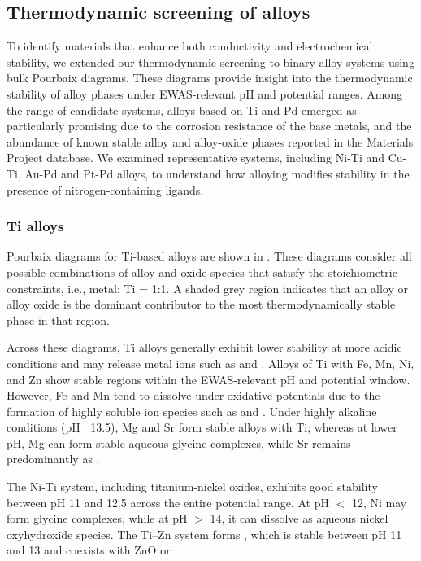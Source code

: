 \documentclass[journal=jacsat,manuscript=article]{achemso}
\begin{document}
\subsection{Thermodynamic screening of alloys} \label{sec:alloy_screening}

To identify materials that enhance both conductivity and electrochemical stability, we extended our thermodynamic screening to binary alloy systems using bulk Pourbaix diagrams. These diagrams provide insight into the thermodynamic stability of alloy phases under EWAS-relevant pH and potential ranges. Among the range of candidate systems, alloys based on Ti and Pd emerged as particularly promising due to the corrosion resistance of the base metals, and the abundance of known stable alloy and alloy-oxide phases reported in the Materials Project database. We examined representative systems, including Ni-Ti and Cu-Ti, Au-Pd and Pt-Pd alloys, to understand how alloying modifies stability in the presence of nitrogen-containing ligands. 




\subsubsection{Ti alloys}

Pourbaix diagrams for Ti-based alloys are shown in . These diagrams consider all possible combinations of alloy and oxide species that satisfy the stoichiometric constraints, i.e., metal: Ti = 1:1. A shaded grey region indicates that an alloy or alloy oxide is the dominant contributor to the most thermodynamically stable phase in that region.

Across these diagrams, Ti alloys generally exhibit lower stability at more acidic conditions and may release metal ions such as  and . Alloys of Ti with Fe, Mn, Ni, and Zn show stable regions within the EWAS-relevant pH and potential window. However, Fe and Mn tend to dissolve under oxidative potentials due to the formation of highly soluble ion species such as  and . Under highly alkaline conditions (pH $\>$ 13.5), Mg and Sr form stable alloys with Ti; whereas at lower pH, Mg can form stable aqueous glycine complexes, while Sr remains predominantly as . 

The Ni-Ti system, including titanium-nickel oxides, exhibits good stability between pH 11 and 12.5 across the entire potential range. At pH $<$ 12, Ni may form glycine complexes, while at pH $>$ 14, it can dissolve as aqueous nickel oxyhydroxide species. The Ti–Zn system forms , which is stable between pH 11 and 13 and coexists with ZnO or .
\end{document}
